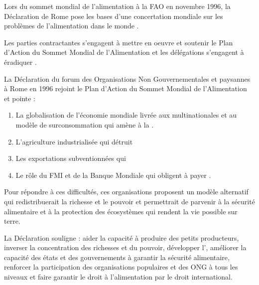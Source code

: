 Lors du sommet mondial de l'alimentation à la FAO en novembre 1996, la Déclaration de Rome pose les bases d'une concertation mondiale sur les problèmes de l'alimentation dans le monde \cite{fao_declaration_1996}.

Les parties contractantes s'engagent à mettre en oeuvre et soutenir le Plan d’Action du Sommet Mondial de l’Alimentation et les délégations s'engagent à éradiquer .

La Déclaration du forum des Organisations Non Gouvernementales et paysannes à Rome en 1996 rejoint le Plan d’Action du Sommet Mondial de l’Alimentation et pointe  : 
\begin{enumerate}
\item La globalisation de l'économie mondiale livrée aux multinationales et au modèle de surconsommation qui amène à la .
\item L'agriculture industrialisée qui détruit 
\item Les exportations subventionnées qui %
\item Le rôle du FMI et de la Banque Mondiale qui obligent  à payer .
\end{enumerate}

Pour répondre à ces difficultés, ces organisations proposent un modèle alternatif  qui redistribuerait la richesse et le pouvoir et permettrait de parvenir à la sécurité alimentaire et à la protection des écosystèmes qui rendent la vie possible sur terre.

La Déclaration souligne  : 
aider la capacité à produire des petits producteurs, 
inverser la concentration des richesses et du pouvoir,
développer l'\agec,
améliorer la capacité des états et des gouvernements à garantir la sécurité alimentaire,
renforcer la participation des organisations populaires et des ONG à tous les niveaux
et faire garantir le droit à l'alimentation par le droit international.


